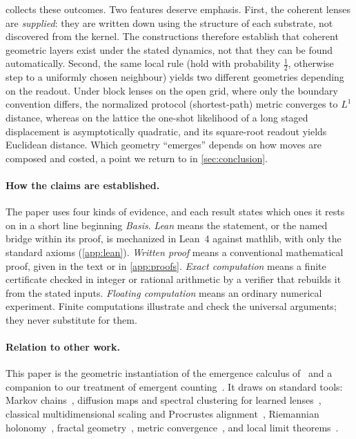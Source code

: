  collects these outcomes.
Two features deserve emphasis.
First, the coherent lenses are \emph{supplied}: they are written down using the structure of each substrate, not discovered from the kernel.
The constructions therefore establish that coherent geometric layers exist under the stated dynamics, not that they can be found automatically.
Second, the same local rule (hold with probability $\tfrac12$, otherwise step to a uniformly chosen neighbour) yields two different geometries depending on the readout.
Under block lenses on the open grid, where only the boundary convention differs, the normalized protocol (shortest-path) metric converges to $L^1$ distance, whereas on the lattice the one-shot likelihood of a long staged displacement is asymptotically quadratic, and its square-root readout yields Euclidean distance.
Which geometry ``emerges'' depends on how moves are composed and costed, a point we return to in \cref{sec:conclusion}.

\paragraph{How the claims are established.}
The paper uses four kinds of evidence, and each result states which ones it rests on in a short line beginning \emph{Basis}.
\emph{Lean} means the statement, or the named bridge within its proof, is mechanized in Lean~4 against mathlib, with only the standard axioms (\cref{app:lean}).
\emph{Written proof} means a conventional mathematical proof, given in the text or in \cref{app:proofs}.
\emph{Exact computation} means a finite certificate checked in integer or rational arithmetic by a verifier that rebuilds it from the stated inputs.
\emph{Floating computation} means an ordinary numerical experiment.
Finite computations illustrate and check the universal arguments; they never substitute for them.

\paragraph{Relation to other work.}
This paper is the geometric instantiation of the emergence calculus of~\cite{SixBirdsTheory} and a companion to our treatment of emergent counting~\cite{ToCountAStone}.
It draws on standard tools: Markov chains~\cite{Norris1997}, diffusion maps and spectral clustering for learned lenses~\cite{CoifmanLafon2006,vonLuxburg2007,Lloyd1982}, classical multidimensional scaling and Procrustes alignment~\cite{BorgGroenen2005,Schonemann1966}, Riemannian holonomy~\cite{Lee1997Riemannian}, fractal geometry~\cite{Falconer2003Fractal}, metric convergence~\cite{Gromov1999Metric}, and local limit theorems~\cite{Durrett2019Probability}.

